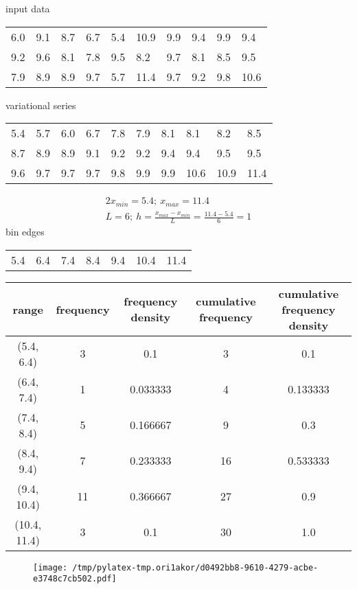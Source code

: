 \documentclass{article}%
\begin{document}
%
\normalsize%
input data%
\begin{longtable}{l l l l l l l l l l }%
6.0&9.1&8.7&6.7&5.4&10.9&9.9&9.4&9.9&9.4\\%
9.2&9.6&8.1&7.8&9.5&8.2&9.7&8.1&8.5&9.5\\%
7.9&8.9&8.9&9.7&5.7&11.4&9.7&9.2&9.8&10.6\\%
\end{longtable}%
variational series%
\begin{longtable}{l l l l l l l l l l }%
5.4&5.7&6.0&6.7&7.8&7.9&8.1&8.1&8.2&8.5\\%
8.7&8.9&8.9&9.1&9.2&9.2&9.4&9.4&9.5&9.5\\%
9.6&9.7&9.7&9.7&9.8&9.9&9.9&10.6&10.9&11.4\\%
\end{longtable}%
\begin{alignat*}{2}%
x_{min} = 5.4; ~ x_{max} = 11.4 \\%
L = 6;
            ~ h = \frac { x_{max} - x_{min} } L
                = \frac { 11.4 - 5.4 } 6
                = 1%
\end{alignat*}%
bin edges%
\begin{longtable}{l l l l l l l }%
5.4&6.4&7.4&8.4&9.4&10.4&11.4\\%
\end{longtable}%
\begin{tabular}{c|c|c|c|c}
\toprule
       range &  frequency & frequency density &  cumulative frequency & cumulative frequency density \\
\midrule
  (5.4, 6.4) &          3 &               0.1 &                     3 &                          0.1 \\
  (6.4, 7.4) &          1 &          0.033333 &                     4 &                     0.133333 \\
  (7.4, 8.4) &          5 &          0.166667 &                     9 &                          0.3 \\
  (8.4, 9.4) &          7 &          0.233333 &                    16 &                     0.533333 \\
 (9.4, 10.4) &         11 &          0.366667 &                    27 &                          0.9 \\
(10.4, 11.4) &          3 &               0.1 &                    30 &                          1.0 \\
\bottomrule
\end{tabular}
%


\begin{figure}[htbp]%
\centering%
\texttt{[image: /tmp/pylatex-tmp.ori1akor/d0492bb8-9610-4279-acbe-e3748c7cb502.pdf]}%
\end{figure}

%
\end{document}
